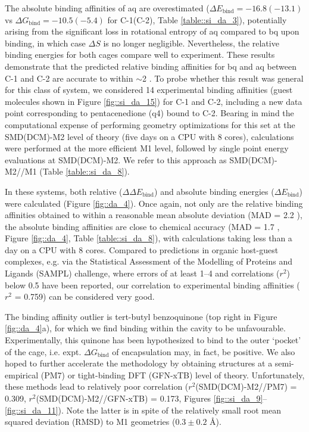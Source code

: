 \documentclass[../../main.tex]{subfiles}
\begin{document}
The absolute binding affinities of aq are overestimated ($\Delta E_\text{bind}= -16.8 (-13.1)$ vs $\Delta G_\text{bind} = -10.5 (-5.4)$ \kcalx for C-1(C-2), Table \ref{table::si_da_3}), potentially arising from the significant loss in rotational entropy of aq compared to bq upon binding, in which case $\Delta S$ is no longer negligible. Nevertheless, the relative binding energies for both cages compare well to experiment. These results demonstrate that the predicted relative binding affinities for bq and aq between C-1 and C-2 are accurate to within $\sim$2 \kcal. To probe whether this result was general for this class of system, we considered 14 experimental binding affinities (guest molecules shown in Figure \ref{fig::si_da_15}) for C-1 and C-2, including a new data point corresponding to pentacenedione (q4) bound to C-2. Bearing in mind the computational expense of performing geometry optimizations for this set at the SMD(DCM)-M2 level of theory (five days on a CPU with 8 cores), calculations were performed at the more efficient M1 level, followed by single point energy evaluations at SMD(DCM)-M2. We refer to this approach as SMD(DCM)-M2//M1 (Table \ref{table::si_da_8}).

In these systems, both relative ($\Delta\Delta E_\text{bind}$) and absolute binding energies ($\Delta E_\text{bind}$) were calculated (Figure \ref{fig::da_4}). Once again, not only are the relative binding affinities obtained to within a reasonable mean absolute deviation (MAD = 2.2 \kcal), the absolute binding affinities are close to chemical accuracy (MAD = 1.7 \kcal, Figure \ref{fig::da_4}, Table \ref{table::si_da_8}), with calculations taking less than a day on a CPU with 8 cores. Compared to predictions in organic host-guest complexes, e.g. via the Statistical Assessment of the Modelling of Proteins and Ligands (SAMPL) challenge, where errors of at least 1–4 \kcalx and correlations ($r^2$) below 0.5 have been reported, our correlation to experimental binding affinities ($r^2$ = 0.759) can be considered very good.\cite{Sure2015, Jensen2015, Rizzi2018}
 
The binding affinity outlier is tert-butyl benzoquinone (top right in Figure \ref{fig::da_4}a), for which we find binding within the cavity to be unfavourable. Experimentally, this quinone has been hypothesized to bind to the outer ‘pocket’ of the cage, i.e. expt. $\Delta G_\text{bind}$ of encapsulation may, in fact, be positive. We also hoped to further accelerate the methodology by obtaining structures at a semi-empirical (PM7\cite{Stewart2012}) or tight-binding DFT (GFN-xTB\cite{Grimme2017xtb}) level of theory. Unfortunately, these methods lead to relatively poor correlation ($r^2$(SMD(DCM)-M2//PM7) = 0.309, $r^2$(SMD(DCM)-M2//GFN-xTB) = 0.173, Figures \ref{fig::si_da_9}--\ref{fig::si_da_11}). Note the latter is in spite of the relatively small root mean squared deviation (RMSD) to M1 geometries ($0.3\pm0.2$ \AA). 
\end{document}
